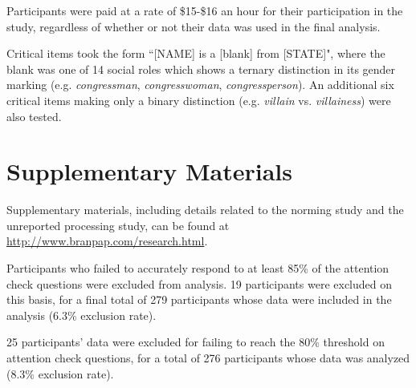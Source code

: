 		Participants were paid at a rate of \$15-\$16 an hour for their participation in the study, regardless of whether or not their data was used in the final analysis.
	

Critical items took the form ``[NAME] is a [blank] from [STATE]", where the blank was one of 14 social roles which shows a ternary distinction in its gender marking (e.g. \textit{congressman}, \textit{congresswoman}, \textit{congressperson}). An additional six critical items making only a binary distinction (e.g. \textit{villain} vs. \textit{villainess}) were also tested. \par 

	\section{Supplementary Materials}
Supplementary materials, including details related to the norming study and the unreported processing study, can be found at \url{http://www.branpap.com/research.html}.

	Participants who failed to accurately respond to at least 85\% of the attention check questions were excluded from analysis. 19 participants were excluded on this basis, for a final total of 279 participants whose data were included in the analysis (6.3\% exclusion rate). \par 
	
25 participants' data were excluded for failing to reach the 80\% threshold on attention check questions, for a total of 276 participants whose data was analyzed (8.3\% exclusion rate).\par
